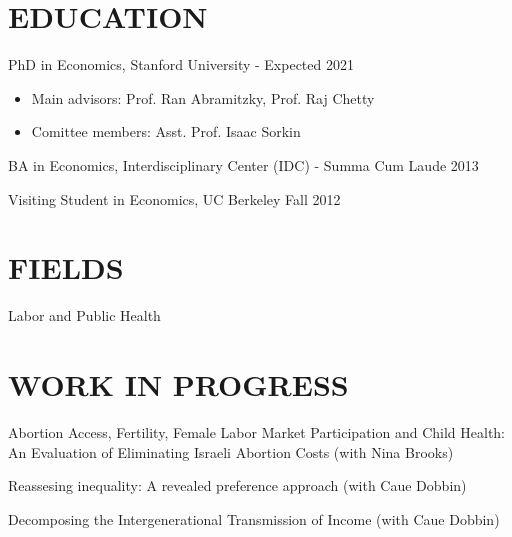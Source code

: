 \documentclass[margin]{res} %
\begin{document}
\begin{resume}



\section{EDUCATION}

PhD in Economics, Stanford University - Expected  \hfill 2021
\begin{itemize}
	\item Main advisors: Prof. Ran Abramitzky, Prof. Raj Chetty
	\item Comittee members: Asst. Prof. Isaac Sorkin
\end{itemize}	

BA in Economics, Interdisciplinary Center (IDC) - Summa Cum Laude \hfill 2013

Visiting Student in Economics, UC Berkeley  \hfill Fall 2012 
 
 
\section{FIELDS}  
 Labor and Public Health
 

\section{ WORK IN PROGRESS} 

Abortion Access, Fertility, Female Labor Market Participation and Child Health: An Evaluation of Eliminating Israeli Abortion Costs (with Nina Brooks)

Reassesing inequality: A revealed preference approach (with Caue Dobbin)

Decomposing the Intergenerational Transmission of Income (with Caue Dobbin)



\end{resume}
\end{document}
